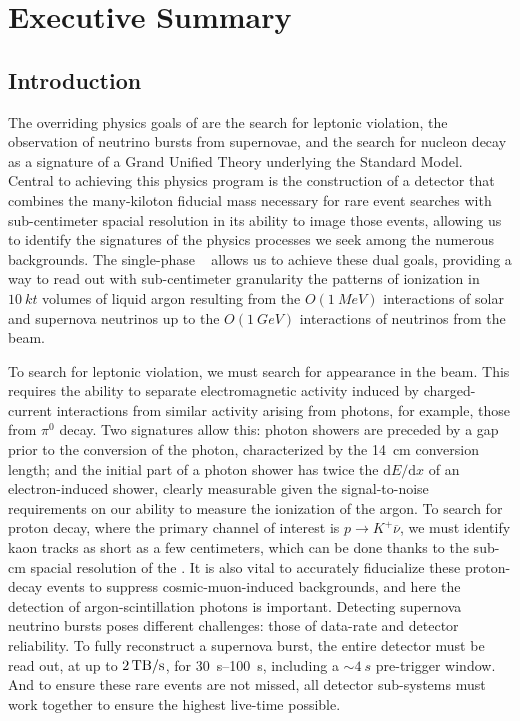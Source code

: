 \chapter{Executive Summary}
\label{ch:fdsp-execsum}

\section{Introduction}
\label{sec:fdsp-exec-introduction}


The overriding physics goals of  are the search for leptonic  violation, the observation of neutrino bursts from supernovae, and the search for nucleon decay as a signature of a Grand Unified Theory underlying the Standard Model. Central to achieving this physics program is the construction of a detector that combines the many-kiloton fiducial mass necessary for rare event searches with sub-centimeter spacial resolution in its ability to image those events, allowing us to identify the signatures of the physics processes we seek among the numerous backgrounds. The single-phase ~\cite{Rubbia:1977zz} allows us to achieve these dual goals, providing a way to read out with sub-centimeter granularity the patterns of ionization in $\SI{10}{kt}$ volumes of liquid argon resulting from the $O(\SI{1}{MeV})$ interactions of solar and supernova neutrinos up to the $O(\SI{1}{GeV})$ interactions of neutrinos from the  beam.

To search for leptonic  violation, we must search for \nue appearance in the  \numu beam. This requires the ability to separate electromagnetic activity induced by charged-current \nue interactions from similar activity arising from photons, for example, those from $\pi^{0}$ decay. Two signatures allow this: photon showers are preceded by a gap prior to the conversion of the photon, characterized by the \SI{14}{cm} conversion length; and the initial part of a photon shower has twice the $\mathrm{d}E/\mathrm{d}x$ of an electron-induced shower, clearly measurable given the signal-to-noise requirements on our ability to measure the ionization of the argon. To search for proton decay, where the primary channel of interest is $p\rightarrow K^{+}\overline{\nu}$, we must identify kaon tracks as short as a few centimeters, which can be done thanks to the sub-\si{cm} spacial resolution of the . It is also vital to accurately fiducialize these proton-decay events to suppress cosmic-muon-induced backgrounds, and here the detection of argon-scintillation photons is important. Detecting supernova neutrino bursts poses different challenges: those of data-rate and detector reliability. To fully reconstruct a supernova burst, the entire detector must be read out, at up to $\SI{2}{\tera\byte/\second}$, for \SIrange{30}{100}{s}, including a $\sim\!\SI{4}{s}$ pre-trigger window. And to ensure these rare events are not missed, all detector sub-systems must work together to ensure the highest live-time possible.

